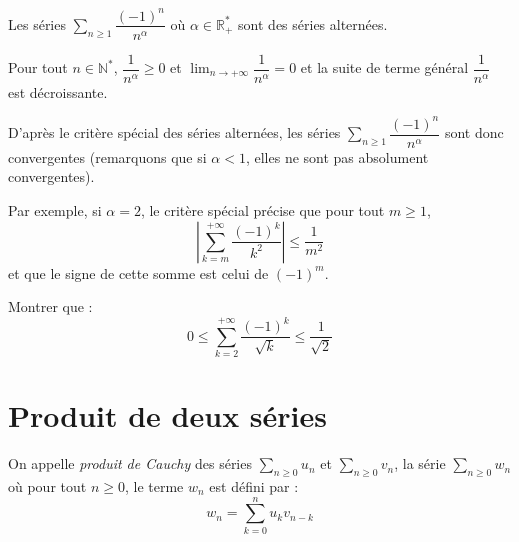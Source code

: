 \documentclass[french,11pt,twoside]{VcCours}
\newcommand{\Sum}[2]{\ensuremath{\textstyle{\sum\limits_{#1}^{#2}}}}
\begin{document}
\newpage

$\phantom{}$

\vspace{7cm}

\begin{ex} Les séries $\Sum{n \geq 1}{} \dfrac{(-1)^n}{n^{\alpha}}$ où $\alpha \in \mathbb{R}_+^{*}$ sont des séries alternées.

Pour tout $n \in \mathbb{N}^*$, $\dfrac{1}{n^{\alpha}} \geq 0$ et $\lim_{n \rightarrow + \infty} \dfrac{1}{n^{\alpha}} = 0$ et la suite de terme général $\dfrac{1}{n^{\alpha}}$ est décroissante. 

D'après le critère spécial des séries alternées, les séries $\Sum{n \geq 1}{} \dfrac{(-1)^n}{n^{\alpha}}$ sont donc convergentes (remarquons que si $\alpha <1$, elles ne sont pas absolument convergentes).

\medskip

Par exemple, si $\alpha = 2$, le critère spécial précise que pour tout $m \geq 1$,
$$ \left\vert \sum_{k=m}^{+ \infty}\dfrac{(-1)^k}{k^{2}}  \right\vert \leq \frac{1}{m^2}$$
et que le signe de cette somme est celui de $(-1)^m$.
\end{ex}

\begin{exa} Montrer que :
$$ 0 \leq \sum_{k=2}^{+ \infty}\dfrac{(-1)^k}{\sqrt{k}} \leq \frac{1}{\sqrt{2}}$$
\end{exa}


\section{Produit de deux séries}

\begin{defin} On appelle \textit{produit de Cauchy} des séries $\Sum{n \geq 0}{} u_n$ et $\Sum{n \geq 0}{} v_n$, la série $\Sum{n \geq 0}{} w_n$ où pour tout $n \geq 0$, le terme $w_n$ est défini par :
$$w_n = \sum_{k=0}^n u_k v_{n-k}$$
\end{defin}
\end{document}
